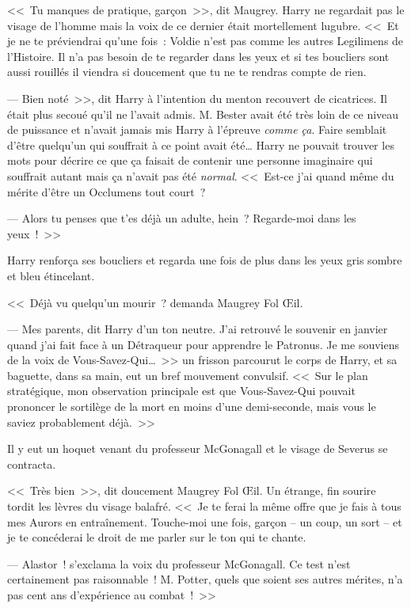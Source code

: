 <<~Tu manques de pratique, garçon~>>, dit Maugrey. Harry ne regardait pas le visage de l'homme mais la voix de ce dernier était mortellement lugubre. <<~Et je ne te préviendrai qu'une fois~: Voldie n'est pas comme les autres Legilimens de l'Histoire. Il n'a pas besoin de te regarder dans les yeux et si tes boucliers sont aussi rouillés il viendra si doucement que tu ne te rendras compte de rien.

--- Bien noté~>>, dit Harry à l'intention du menton recouvert de cicatrices. Il était plus secoué qu'il ne l'avait admis. M. Bester avait été très loin de ce niveau de puissance et n'avait jamais mis Harry à l'épreuve \emph{comme ça}. Faire semblait d'être quelqu'un qui souffrait à ce point avait été… Harry ne pouvait trouver les mots pour décrire ce que ça faisait de contenir une personne imaginaire qui souffrait autant mais ça n'avait pas été \emph{normal}. <<~Est-ce j'ai quand même du mérite d'être un Occlumens tout court~?

--- Alors tu penses que t'es déjà un adulte, hein~? Regarde-moi dans les yeux~!~>>

Harry renforça ses boucliers et regarda une fois de plus dans les yeux gris sombre et bleu étincelant.

<<~Déjà vu quelqu'un mourir~? demanda Maugrey Fol Œil.

--- Mes parents, dit Harry d'un ton neutre. J'ai retrouvé le souvenir en janvier quand j'ai fait face à un Détraqueur pour apprendre le Patronus. Je me souviens de la voix de Vous-Savez-Qui…~>> un frisson parcourut le corps de Harry, et sa baguette, dans sa main, eut un bref mouvement convulsif. <<~Sur le plan stratégique, mon observation principale est que Vous-Savez-Qui pouvait prononcer le sortilège de la mort en moins d'une demi-seconde, mais vous le saviez probablement déjà.~>>

Il y eut un hoquet venant du professeur McGonagall et le visage de Severus se contracta.

<<~Très bien~>>, dit doucement Maugrey Fol Œil. Un étrange, fin sourire tordit les lèvres du visage balafré. <<~Je te ferai la même offre que je fais à tous mes Aurors en entraînement. Touche-moi une fois, garçon -- un coup, un sort -- et je te concéderai le droit de me parler sur le ton qui te chante.

--- Alastor~! s'exclama la voix du professeur McGonagall. Ce test n'est certainement pas raisonnable~! M. Potter, quels que soient ses autres mérites, n'a pas cent ans d'expérience au combat~!~>>

